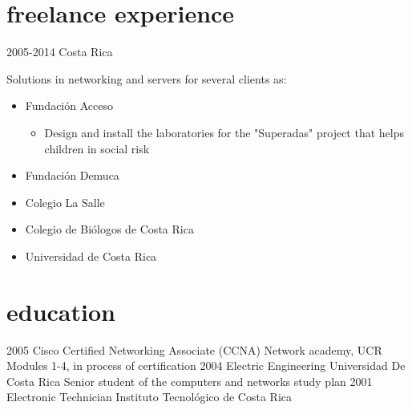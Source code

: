 \documentclass[]{friggeri-cv} %
\begin{document}
\section{freelance experience}
\begin{entrylist}
\entry
{2005-2014}
{}
{Costa Rica}
{
Solutions in networking and servers for several clients as:
\begin{itemize}
\item Fundación Acceso
\begin{itemize}
\item Design and install the laboratories for the "Superadas" project that helps children in social risk
\end{itemize}
\item Fundación Demuca
\item Colegio La Salle
\item Colegio de Biólogos de Costa Rica
\item Universidad de Costa Rica
\end{itemize}
}
\end{entrylist}


\section{education}
\begin{entrylist}
\entry
{2005}
{Cisco Certified Networking Associate (CCNA)}
{Network academy, UCR}
{Modules 1-4, in process of certification}
\entry
{2004}
{Electric Engineering}
{Universidad De Costa Rica}
{Senior student of the computers and networks study plan}
\entry
{2001}
{Electronic Technician}
{Instituto Tecnológico de Costa Rica}
{}
\end{entrylist}

\end{document}
